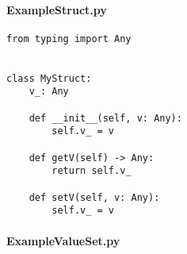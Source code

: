 \paragraph{ExampleStruct.py}
\label{appendix:static-dynamic-bridge.python.vs.ExampleStruct.py}

\begin{verbatim}
from typing import Any


class MyStruct:
    v_: Any

    def __init__(self, v: Any):
        self.v_ = v

    def getV(self) -> Any:
        return self.v_

    def setV(self, v: Any):
        self.v_ = v
\end{verbatim}

\paragraph{ExampleValueSet.py}
\label{appendix:static-dynamic-bridge.python.vs.ExampleValueSet.py}

